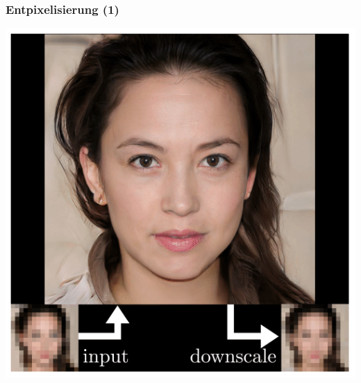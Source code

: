 \documentclass[aspectratio=169,xcolor=dvipsnames]{beamer}
\begin{document}
\begin{frame}
\frametitle{Entpixelisierung (1)}
\begin{center}
\includegraphics[height=0.7\paperheight,keepaspectratio]{images/example_depixelise} 
\end{center}
\end{frame}
\end{document}
